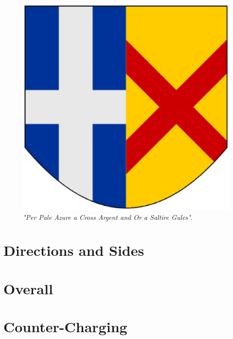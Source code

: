 
\begin{figure}[H]
  \centering
    \includegraphics[width=\textwidth]{blazon/images/perpaleazureacrossargent.eps}
  \caption{\emph{"Per Pale Azure a Cross Argent and Or a Saltire Gules"}.\cite{linetypes}}
  
\end{figure}


\section{Directions and Sides}


\section{Overall}

\section{Counter-Charging}

